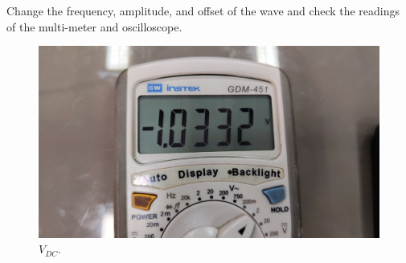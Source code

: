 \documentclass[11pt]{article}
\newcommand{\PicScale}{0.2}
\begin{document}
\begin{question}
\begin{subquestion}{Change the frequency, amplitude, and offset of the wave and check the readings of the multi-meter and oscilloscope.}
{    \begin{figure}[H]
        \begin{center}
            \includegraphics[scale=\PicScale]{Fig/29.jpeg}
            \caption{$V_{DC}$.}
        \end{center}
    \end{figure}
}
\end{subquestion}


\end{question}
\end{document}
